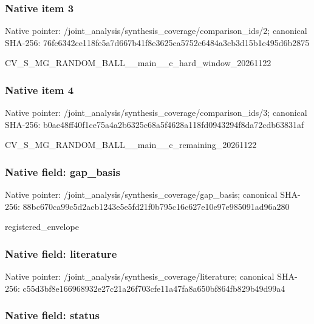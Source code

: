 \documentclass[10pt,a4paper]{article}
\begin{document}
\subsubsection{Native item 3}


Native pointer: /joint\_analysis/synthesi\allowbreak{}s\_coverage/comparison\_id\allowbreak{}s/2; canonical SHA-256: 76fc6342ce118fe5a7d667b4\allowbreak{}1f8e3625ca5752c6484a3cb3\allowbreak{}d15b1e495d6b2875


CV\_S\_MG\_RANDOM\_BALL\_\_mai\allowbreak{}n\_\_c\_hard\_window\_2026112\allowbreak{}2


\subsubsection{Native item 4}


Native pointer: /joint\_analysis/synthesi\allowbreak{}s\_coverage/comparison\_id\allowbreak{}s/3; canonical SHA-256: b0ae48ff40f1ce75a4a2b632\allowbreak{}5c68a5f4628a118fd0943294\allowbreak{}f8da72cdb63831af


CV\_S\_MG\_RANDOM\_BALL\_\_mai\allowbreak{}n\_\_c\_remaining\_20261122


\subsubsection{Native field: gap\_basis}


Native pointer: /joint\_analysis/synthesi\allowbreak{}s\_coverage/gap\_basis; canonical SHA-256: 88bc670ca99c5d2acb1243e5\allowbreak{}e5fd21f0b795c16c627e10e9\allowbreak{}7e985091ad96a280


registered\_envelope


\subsubsection{Native field: literature}


Native pointer: /joint\_analysis/synthesi\allowbreak{}s\_coverage/literature; canonical SHA-256: c55d3bf8e166968932e27c21\allowbreak{}a26f703cfe11a47fa8a650bf\allowbreak{}864fb829b49d99a4



\subsubsection{Native field: status}
\end{document}
